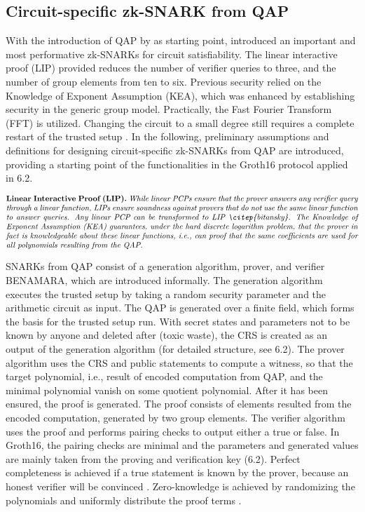\subsection{Circuit-specific zk-SNARK from QAP}
With the introduction of QAP by \citet{GennaroLinPCP} as starting point, \citet{Groth2016OnTS} introduced an important and most performative zk-SNARKs for circuit satisfiability. The linear interactive proof (LIP) provided reduces the number of verifier queries to three, and the number of group elements from ten to six. Previous security relied on the Knowledge of Exponent Assumption (KEA), which was enhanced by establishing security in the generic group model. Practically, the Fast Fourier Transform (FFT) is utilized. Changing the circuit to a small degree still requires a complete restart of the trusted setup \citep{Thaler}. In the following, preliminary assumptions and definitions for designing circuit-specific zk-SNARKs from QAP are introduced, providing a starting point of the functionalities in the Groth16 protocol applied in 6.2.

\begin{align*}
    \text{\parbox{450pt}{\textbf{Linear Interactive Proof (LIP).} \textit{While linear PCPs ensure that the prover answers any verifier query through a linear function, LIPs ensure soundness against provers that do not use the same linear function to answer queries. Any linear PCP can be transformed to LIP \citep{bitansky}. The Knowledge of Exponent Assumption (KEA) guarantees, under the hard discrete logarithm problem, that the prover in fact is knowledgeable about these linear functions, i.e., can proof that the same coefficients are used for all polynomials resulting from the QAP.}}}
\end{align*}

SNARKs from QAP consist of a generation algorithm, prover, and verifier \citep{Groth2016OnTS, Guo}BENAMARA, which are introduced informally.
The generation algorithm executes the trusted setup by taking a random security parameter and the arithmetic circuit as input. The QAP is generated over a finite field, which forms the basis for the trusted setup run. With secret states and parameters not to be known by anyone and deleted after (toxic waste), the CRS is created as an output of the generation algorithm (for detailed structure, see 6.2). The prover algorithm uses the CRS and public statements to compute a witness, so that the target polynomial, i.e., result of encoded computation from QAP, and the minimal polynomial vanish on some quotient polynomial. After it has been ensured, the proof is generated. The proof consists of elements resulted from the encoded computation, generated by two group elements. The verifier algorithm uses the proof and performs pairing checks to output either a true or false. In Groth16, the pairing checks are minimal and the parameters and generated values are mainly taken from the proving and verification key (6.2). Perfect completeness is achieved if a true statement is known by the prover, because an honest verifier will be convinced \citep{Guo}. Zero-knowledge is achieved by randomizing the polynomials and uniformly distribute the proof terms \citep{Groth2016OnTS, Groth2010ShortPN}.


